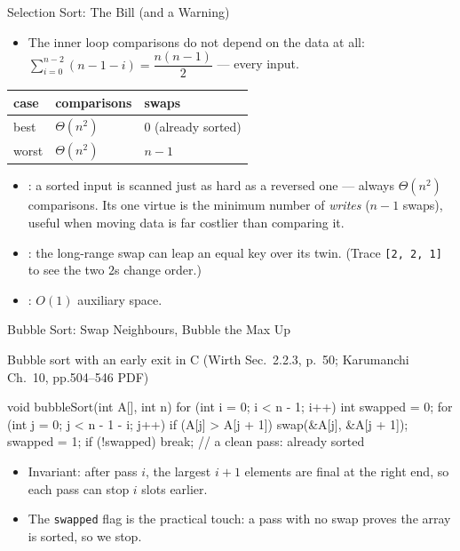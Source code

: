 \documentclass[aspectratio=169]{beamer}
\begin{document}
\begin{frame}{Selection Sort: The Bill (and a Warning)}
  \begin{itemize}
    \item The inner loop comparisons do not depend on the data at all:
      $\sum_{i=0}^{n-2} (n-1-i) = \dfrac{n(n-1)}{2}$ --- every input.
  \end{itemize}
  \begin{center}
  {\footnotesize
  \begin{tabular}{lll}
    \toprule
    \textbf{case} & \textbf{comparisons} & \textbf{swaps} \\
    \midrule
    best & $\Theta(n^2)$ & $0$ (already sorted) \\
    worst & $\Theta(n^2)$ & $n-1$ \\
    \bottomrule
  \end{tabular}}
  \end{center}
  \begin{itemize}
    \item {}: a sorted input is scanned just as hard as a
      reversed one --- always $\Theta(n^2)$ comparisons. Its one virtue is
      the minimum number of \emph{writes} ($n-1$ swaps), useful when moving
      data is far costlier than comparing it.
    \item {}: the long-range swap can leap an equal key over
      its twin. (Trace \texttt{[2, 2, 1]} to see the two $2$s change order.)
    \item {}: $O(1)$ auxiliary space.
  \end{itemize}
\end{frame}

\begin{frame}[fragile]{Bubble Sort: Swap Neighbours, Bubble the Max Up}
  \footnotesize
  \begin{block}{Bubble sort with an early exit in C (Wirth Sec.~2.2.3, p.~50;
    Karumanchi Ch.~10, pp.504--546 PDF)
    \cite{Wirth2004_algorithms_data_structures,Karumanchi2017_data_structures_algorithms_made_easy}}
\begin{semiverbatim}
void bubbleSort(int A[], int n) {
  for (int i = 0; i < n - 1; i++) {
    int swapped = 0;
    for (int j = 0; j < n - 1 - i; j++)
      if (A[j] > A[j + 1]) { swap(&A[j], &A[j + 1]); swapped = 1; }
    if (!swapped) break;     // a clean pass: already sorted
  }
}
\end{semiverbatim}
  \end{block}
  \begin{itemize}
    \item Invariant: after pass $i$, the largest $i+1$ elements are final at
      the right end, so each pass can stop $i$ slots earlier.
    \item The \texttt{swapped} flag is the practical touch: a pass with no
      swap proves the array is sorted, so we stop.
  \end{itemize}
\end{frame}
\end{document}
